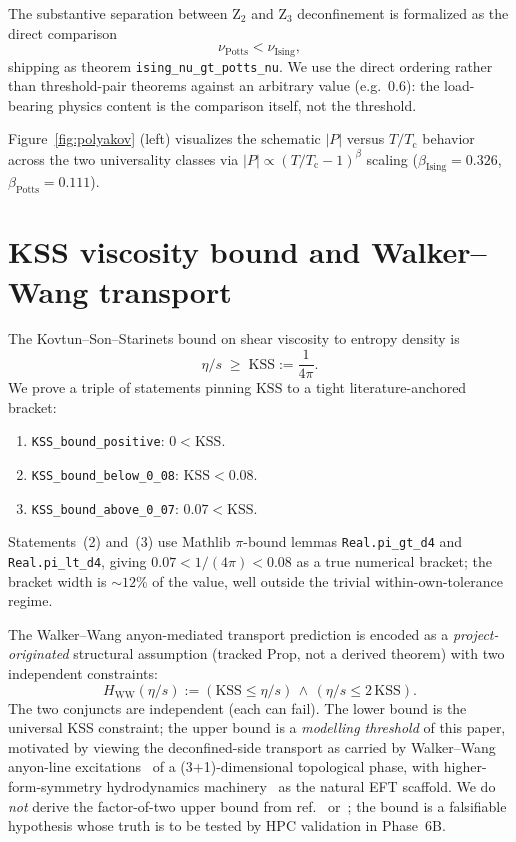 \documentclass[twocolumn]{revtex4-2}
\newcommand{\Tc}{T_{\mathrm{c}}}
\newcommand{\Polyakov}{P}
\newcommand{\KSS}{\eta/s}
\newcommand{\nuIsing}{\nu_{\mathrm{Ising}}}
\newcommand{\nuPotts}{\nu_{\mathrm{Potts}}}
\begin{document}
The substantive separation between Z$_2$ and Z$_3$ deconfinement is
formalized as the direct comparison
\begin{equation}
\nuPotts < \nuIsing,
\label{eq:ising-gt-potts}
\end{equation}
shipping as theorem \texttt{ising\_nu\_gt\_potts\_nu}. We use the
direct ordering rather than threshold-pair theorems against an
arbitrary value (e.g.\ $0.6$): the load-bearing physics content is
the comparison itself, not the threshold.

Figure~\ref{fig:polyakov} (left) visualizes the schematic $|\Polyakov|$
versus $T/\Tc$ behavior across the two universality classes via
$|\Polyakov| \propto (T/\Tc - 1)^\beta$ scaling
($\beta_{\mathrm{Ising}} = 0.326$,
$\beta_{\mathrm{Potts}} = 0.111$).

\section{KSS viscosity bound and Walker--Wang transport}
\label{sec:walker-wang}

The Kovtun--Son--Starinets bound on shear viscosity to entropy
density is~\cite{KovtunSonStarinets2005}
\begin{equation}
\KSS \;\ge\; \mathrm{KSS} := \frac{1}{4\pi}.
\label{eq:kss}
\end{equation}
We prove a triple of statements pinning $\mathrm{KSS}$ to a tight
literature-anchored bracket:
\begin{enumerate}
\item \texttt{KSS\_bound\_positive}: $0 < \mathrm{KSS}$.
\item \texttt{KSS\_bound\_below\_0\_08}: $\mathrm{KSS} < 0.08$.
\item \texttt{KSS\_bound\_above\_0\_07}: $0.07 < \mathrm{KSS}$.
\end{enumerate}
Statements~(2) and~(3) use Mathlib $\pi$-bound lemmas
\texttt{Real.pi\_gt\_d4} and \texttt{Real.pi\_lt\_d4}, giving
$0.07 < 1/(4\pi) < 0.08$ as a true numerical bracket; the bracket
width is $\sim 12\%$ of the value, well outside the trivial
within-own-tolerance regime.

The Walker--Wang anyon-mediated transport prediction is encoded as a
\emph{project-originated} structural assumption (tracked Prop, not a
derived theorem) with two independent constraints:
\begin{equation}
H_{\mathrm{WW}}(\KSS) :=
(\mathrm{KSS} \le \KSS) \,\wedge\, (\KSS \le 2\,\mathrm{KSS}).
\label{eq:H-ww}
\end{equation}
The two conjuncts are independent (each can fail). The lower bound is
the universal KSS constraint; the upper bound is a \emph{modelling
threshold} of this paper, motivated by viewing the deconfined-side
transport as carried by Walker--Wang anyon-line
excitations~\cite{WalkerWang2012} of a (3+1)-dimensional topological
phase, with higher-form-symmetry hydrodynamics
machinery~\cite{HofmanIqbal2018} as the natural EFT scaffold. We do
\emph{not} derive the factor-of-two upper bound from
ref.~\cite{WalkerWang2012} or~\cite{HofmanIqbal2018}; the bound is a
falsifiable hypothesis whose truth is to be tested by HPC validation
in Phase~6B.
\end{document}
